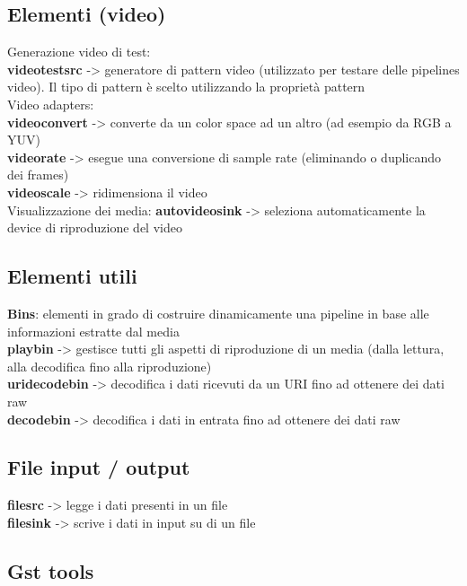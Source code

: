 \documentclass[8pt,a4paper]{article}
\begin{document}
\begin{multicols}{5}
    \subsection{Elementi (video)}
    Generazione video di test:\\
    \textbf{videotestsrc} -> generatore di pattern video (utilizzato per testare delle pipelines
    video). Il tipo di pattern è scelto utilizzando la proprietà pattern\\
    \noindent
    Video adapters:\\
    \textbf{videoconvert} -> converte da un color space ad un altro (ad esempio da RGB a YUV)\\
    \textbf{videorate} -> esegue una conversione di sample rate (eliminando o duplicando dei frames)\\
    \textbf{videoscale} -> ridimensiona il video\\
    \noindent
    Visualizzazione dei media:
    \textbf{autovideosink} -> seleziona automaticamente la device di riproduzione del video

    \subsection{Elementi utili}

    \textbf{Bins}: elementi in grado di costruire dinamicamente una pipeline in base alle informazioni estratte dal media\\
    \noindent
    \textbf{playbin} -> gestisce tutti gli aspetti di riproduzione di un media (dalla lettura, alla decodifica fino alla riproduzione)\\
    \textbf{uridecodebin} -> decodifica i dati ricevuti da un URI fino ad ottenere dei dati raw\\
    \textbf{decodebin} -> decodifica i dati in entrata fino ad ottenere dei dati raw
    
    \subsection{File input / output}
    
    \textbf{filesrc} -> legge i dati presenti in un file\\
    \textbf{filesink} -> scrive i dati in input su di un file\\

    \subsection{Gst tools} 
    

\end{multicols}
\end{document}

